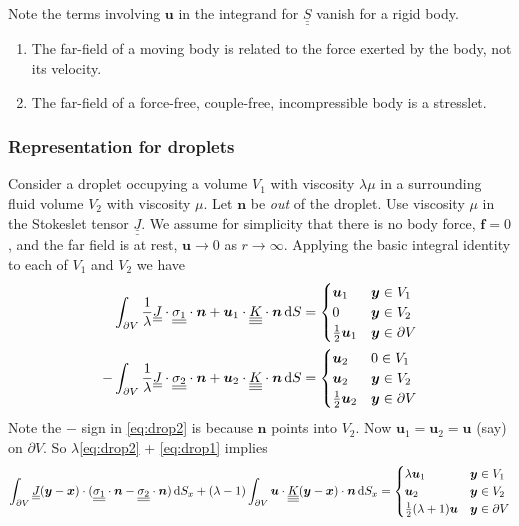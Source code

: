 \documentclass{jknotes}
\newcommand{\dunder}[1]{\underline{\underline{#1}}}
\newcommand{\x}{\bm{x}}
\renewcommand{\u}{\bm{u}}
\newcommand{\y}{\bm{y}}
\begin{document}
Note the terms involving $\u$ in the integrand for $\dunder{S}$ vanish for a
rigid body.

\begin{enumerate}
	\item The far-field of a moving body is related to the force exerted by
		the body, not its velocity.
	\item The far-field of a force-free, couple-free, incompressible body is a
		stresslet.
\end{enumerate}

\subsubsection{Representation for droplets}
Consider a droplet occupying a volume $V_1$ with viscosity $\lambda \mu$ in a
surrounding fluid volume $V_2$ with viscosity $\mu$. Let $\bm{n}$ be
\emph{out} of the droplet. Use viscosity $\mu$ in the Stokeslet tensor
$\dunder{J}$. We assume for simplicity that there is no body force, $\bm{f} =
0$, and the far field is at rest, $\bm{u} \to 0$ as $r \to \infty$. Applying
the basic integral identity to each of $V_1$ and $V_2$ we have
\begin{align}
	\int_{\partial V} \frac{1}{\lambda} \dunder{J} \cdot \dunder{\sigma_1}
	\cdot \bm{n} + \u_1 \cdot \dunder{\underline{K}} \cdot \bm{n} \, \diffd S
	&= \begin{cases} \u_1 & \y \in V_1 \\ 0 & \y \in V_2 \\ \frac{1}{2}\u_1 &
	\y \in \partial V \end{cases} \label{eq:drop1} \\
	-\int_{\partial V} \frac{1}{\lambda} \dunder{J} \cdot \dunder{\sigma_2}
	\cdot \bm{n} + \u_2 \cdot \dunder{\underline{K}} \cdot \bm{n} \, \diffd S
	&= \begin{cases} \u_2 & 0 \in V_1 \\ \u_2 & \y \in V_2 \\ \frac{1}{2}\u_2 &
	\y \in \partial V \end{cases} \label{eq:drop2} \\
\end{align}
Note the $-$ sign in \eqref{eq:drop2} is because $\bm{n}$ points into $V_2$.
Now $\u_1 = \u_2 = \u$ (say) on $\partial V$. So $\lambda$\eqref{eq:drop2} +
\eqref{eq:drop1} implies
\begin{equation}
	\int_{\partial V} \dunder{J}(\y-\x) \cdot (\dunder{\sigma_1} \cdot \bm{n}
	- \dunder{\sigma_2} \cdot \bm{n})\,\diffd S_x + (\lambda-1) \int_{\partial
		V} \u \cdot \dunder{\underline{K}}(\y-\x)\cdot\bm{n}\,\diffd S_x =
		\begin{cases} \lambda \u_1 & \y \in V_1 \\ \u_2 & \y \in V_2 \\
		\frac{1}{2}(\lambda+1)\u & \y \in \partial V \end{cases}
\end{equation}
\end{document}
